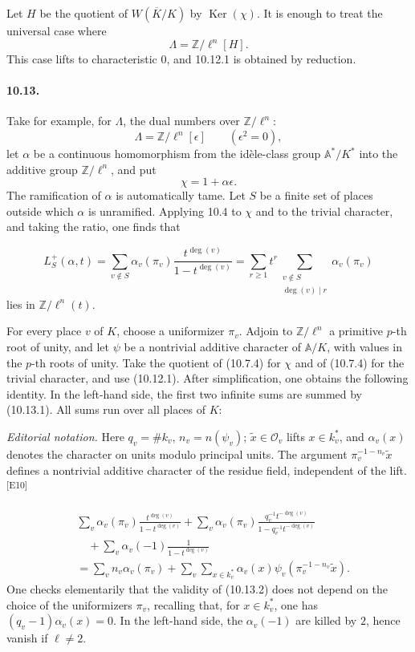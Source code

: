 \documentclass[10pt,letterpaper]{article}
\providecommand{\Ker}{\operatorname{Ker}}
\providecommand{\bbA}{\mathbb A}
\providecommand{\bbA}{\mathbb A}
\providecommand{\bbA}{\mathbb A}
\providecommand{\bbA}{\mathbb A}
\providecommand{\bbA}{\mathbb A}
\providecommand{\Ker}{\operatorname{Ker}}
\newcommand{\auditmark}[1]{\textsuperscript{\normalfont\scriptsize[E#1]}}
\begin{document}
Let \(H\) be the quotient of \(W(\overline K/K)\) by \(\Ker(\chi)\). It is enough to treat the universal case where
\[
\Lambda=\mathbb Z/\ell^n[H].
\]
This case lifts to characteristic \(0\), and 10.12.1 is obtained by reduction.

\paragraph{10.13.} Take for example, for \(\Lambda\), the dual numbers over \(\mathbb Z/\ell^n\):
\[
\Lambda=\mathbb Z/\ell^n[\epsilon]\qquad(\epsilon^2=0),
\]
let \(\alpha\) be a continuous homomorphism from the idèle-class group \(\bbA^*/K^*\) into the additive group \(\mathbb Z/\ell^n\), and put
\[
\chi=1+\alpha\epsilon.
\]
The ramification of \(\alpha\) is automatically tame. Let \(S\) be a finite set of places outside which \(\alpha\) is unramified. Applying 10.4 to \(\chi\) and to the trivial character, and taking the ratio, one finds that

\[
\tag{10.13.1}
L_S^+(\alpha,t)=
\sum_{v\notin S}\alpha_v(\pi_v)\frac{t^{\deg(v)}}{1-t^{\deg(v)}}
=
\sum_{r\ge1}t^r\sum_{\substack{v\notin S\\\deg(v)\mid r}}\alpha_v(\pi_v)
\]
lies in \(\mathbb Z/\ell^n(t)\).

For every place \(v\) of \(K\), choose a uniformizer \(\pi_v\). Adjoin to \(\mathbb Z/\ell^n\) a primitive \(p\)-th root of unity, and let \(\psi\) be a nontrivial additive character of \(\bbA/K\), with values in the \(p\)-th roots of unity. Take the quotient of (10.7.4) for \(\chi\) and of (10.7.4) for the trivial character, and use (10.12.1). After simplification, one obtains the following identity. In the left-hand side, the first two infinite sums are summed by (10.13.1). All sums run over all places of \(K\):
\par\smallskip\noindent\textit{Editorial notation.} Here \(q_v=\#k_v\), \(n_v=n(\psi_v)\);
\(\widetilde x\in\mathcal O_v\) lifts \(x\in k_v^*\), and
\(\alpha_v(x)\) denotes the character on units modulo principal units.
The argument \(\pi_v^{-1-n_v}\widetilde x\) defines a nontrivial additive character
of the residue field, independent of the lift.\auditmark{10}

\[
\tag{10.13.2}
\begin{aligned}
&\sum_v\alpha_v(\pi_v)\frac{t^{\deg(v)}}{1-t^{\deg(v)}}
+\sum_v\alpha_v(\pi_v)\frac{q_v^{-1}t^{-\deg(v)}}{1-q_v^{-1}t^{-\deg(v)}}
\\
&\quad+\sum_v\alpha_v(-1)\frac{1}{1-t^{\deg(v)}}
\\
&=\sum_v n_v\alpha_v(\pi_v)
+\sum_v\sum_{x\in k_v^*}\alpha_v(x)\psi_v(\pi_v^{-1-n_v}\widetilde x).
\end{aligned}
\]
One checks elementarily that the validity of (10.13.2) does not depend on the choice of the uniformizers \(\pi_v\), recalling that, for \(x\in k_v^*\), one has \((q_v-1)\alpha_v(x)=0\). In the left-hand side, the \(\alpha_v(-1)\) are killed by \(2\), hence vanish if \(\ell\ne2\).
\end{document}
